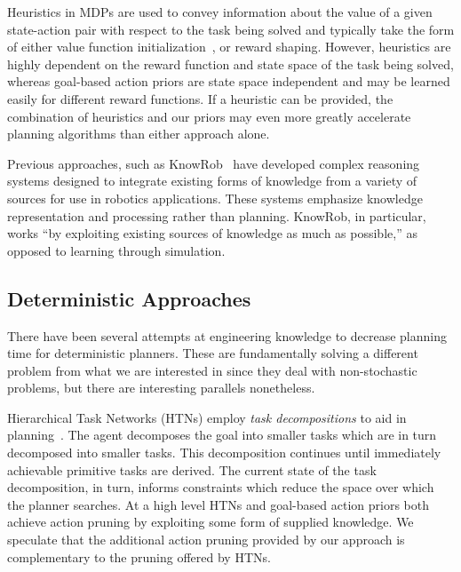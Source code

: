 \documentclass[letterpaper]{article}
\begin{document}
Heuristics in MDPs are used to convey information about the value of a
given state-action pair with respect to the task being solved and
typically take the form of either value function
initialization~\citep{Hansen:1999qf}, or reward shaping\cite{potshap}.
However, heuristics are highly dependent on the reward function and
state space of the task being solved, whereas goal-based action priors are state
space independent and may be learned easily for different reward
functions. If a heuristic can be provided, the combination of
heuristics and our priors may even more greatly accelerate planning
algorithms than either approach alone.

Previous approaches, such as KnowRob~\citep{tenorth2012knowledge,tenorth2009knowrob} have developed complex reasoning systems designed to integrate existing forms of knowledge from a variety of sources for use in robotics applications. These systems emphasize knowledge representation and processing rather than planning. KnowRob, in particular, works ``by exploiting existing sources of knowledge as much as possible,'' as opposed to learning through simulation.

\subsection{Deterministic Approaches}

There have been several attempts at engineering knowledge
to decrease planning time for deterministic planners. These are
fundamentally solving a different problem from what we are interested
in since they deal with non-stochastic problems, but there are
interesting parallels nonetheless.


Hierarchical Task Networks (HTNs) employ \textit{task decompositions}
to aid in planning~\cite{erol1994htn}. The agent decomposes the goal
into smaller tasks which are in turn decomposed into smaller
tasks. This decomposition continues until immediately achievable
primitive tasks are derived. The current state of the task
decomposition, in turn, informs constraints which reduce the space
over which the planner searches. At a high level HTNs and goal-based action priors
both achieve action pruning by exploiting some form of supplied
knowledge. We speculate that the additional action pruning provided by our approach
is complementary to the pruning offered by HTNs.
\end{document}
